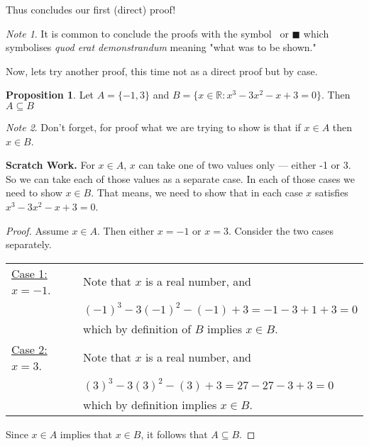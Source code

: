 \documentclass{amsart} %
\theoremstyle{definition} %
\theoremstyle{definition}
\newtheorem*{prpn}{Proposition}
\theoremstyle{remark} %
\newtheorem*{note}{Note}
\begin{document}
Thus concludes our first (direct) proof!

\begin{note}
It is common to conclude the proofs with the symbol \qedsymbol\ or $\blacksquare$ which symbolises \emph{quod erat demonstrandum} meaning "what was to be shown."
\end{note}

\bigskip
\bigskip

Now, lets try another proof, this time not as a direct proof but by case.

\begin{prpn}
Let $A = \{-1,3\}$ and $B = \{x \in \mathbb{R}: x^3 - 3x^2 - x + 3 = 0  \} $. Then $A \subseteq B$
\end{prpn}

\begin{note}
Don't forget, for proof what we are trying to show is that if $x \in A$ then $x \in B$.
\end{note}

\noindent \textbf{Scratch Work.} For $x \in A$, $x$ can take one of two values only --- either -1 or 3. So we can take each of those values as a separate case. In each of those cases we need to show $x \in B$. That means, we need to show that in each case $x$ satisfies $x^3 - 3x^2 - x + 3 = 0$.

\begin{proof}
      Assume $x \in A$. Then either $x = -1$ or $x = 3$. Consider the two cases separately.
    \begin{center}
      \begin{tabular}{l l}
            \underline{Case 1: $x = -1$}. & Note that $x$ is a real number, and \\
            & $(-1)^3 - 3(-1)^2 - (-1) + 3 = -1 - 3 + 1 + 3 = 0$ \\
            & which by definition of $B$ implies $x \in B$. \\

            \underline{Case 2: $x = 3$}. & Note that $x$ is a real number, and \\
            & $(3)^3 - 3(3)^2 - (3) + 3 = 27 - 27 - 3 + 3 = 0$ \\
            & which by definition implies $x \in B$.
      \end{tabular}
    \end{center}
      Since $x \in A$ implies that $x \in B$, it follows that $A \subseteq B$.
\end{proof}
\end{document}
